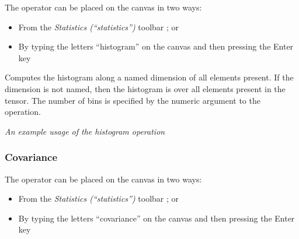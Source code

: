 The operator can be placed on the canvas in two ways:
\begin{itemize}
\item From the \emph{Statistics (``statistics'')} toolbar ;
or 
\item By typing the letters ``histogram'' on the canvas and then pressing
the Enter key
\end{itemize}
Computes the histogram along a named dimension of all elements present.
If the dimension is not named, then the histogram is over all elements
present in the tensor. The number of bins is specified by the numeric
argument to the operation.
\begin{center}
\par\end{center}

\begin{center}
{\em An example usage of the histogram operation} 
\par\end{center}

\subsubsection{Covariance}

\label{Operation:covariance}


The operator can be placed on the canvas in two ways:
\begin{itemize}
\item From the \emph{Statistics (``statistics'')} toolbar ;
or 
\item By typing the letters ``covariance'' on the canvas and then pressing
the Enter key
\end{itemize}

